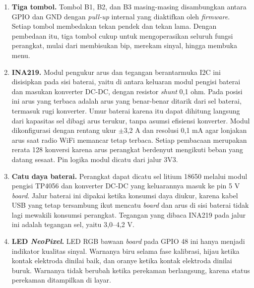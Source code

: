 \begin{enumerate}[label=\alph*.]
  \item \textbf{Tiga tombol.} Tombol B1, B2, dan B3 masing-masing disambungkan antara GPIO dan GND dengan \textit{pull-up} internal yang diaktifkan oleh \textit{firmware}. Setiap tombol membedakan tekan pendek dan tekan lama. Dengan pembedaan itu, tiga tombol cukup untuk mengoperasikan seluruh fungsi perangkat, mulai dari membisukan bip, merekam sinyal, hingga membuka menu.
  \item \textbf{INA219.} Modul pengukur arus dan tegangan berantarmuka I2C ini disisipkan pada sisi baterai, yaitu di antara keluaran modul pengisi baterai dan masukan konverter DC-DC, dengan resistor \textit{shunt} 0,1 ohm. Pada posisi ini arus yang terbaca adalah arus yang benar-benar ditarik dari sel baterai, termasuk rugi konverter. Umur baterai karena itu dapat dihitung langsung dari kapasitas sel dibagi arus terukur, tanpa asumsi efisiensi konverter. Modul dikonfigurasi dengan rentang ukur $\pm$3,2 A dan resolusi 0,1 mA agar lonjakan arus saat radio WiFi memancar tetap terbaca. Setiap pembacaan merupakan rerata 128 konversi karena arus perangkat berdenyut mengikuti beban yang datang sesaat. Pin logika modul dicatu dari jalur 3V3.
  \item \textbf{Catu daya baterai.} Perangkat dapat dicatu sel litium 18650 melalui modul pengisi TP4056 dan konverter DC-DC yang keluarannya masuk ke pin 5 V \textit{board}. Jalur baterai ini dipakai ketika konsumsi daya diukur, karena kabel USB yang tetap tersambung ikut mencatu \textit{board} dan arus di sisi baterai tidak lagi mewakili konsumsi perangkat. Tegangan yang dibaca INA219 pada jalur ini adalah tegangan sel, yaitu 3,0--4,2 V.
  \item \textbf{LED \textit{NeoPixel}.} LED RGB bawaan \textit{board} pada GPIO 48 ini hanya menjadi indikator kualitas sinyal. Warnanya biru selama fase kalibrasi, hijau ketika kontak elektroda dinilai baik, dan oranye ketika kontak elektroda dinilai buruk. Warnanya tidak berubah ketika perekaman berlangsung, karena status perekaman ditampilkan di layar.
\end{enumerate}

